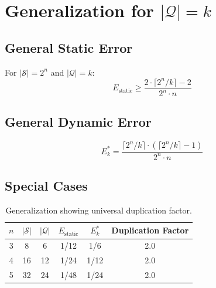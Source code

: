 \documentclass[11pt]{article}
\begin{document}
\appendix

\section{Generalization for $|\mathcal{Q}| = k$}

\subsection{General Static Error}

For $|\mathcal{S}| = 2^n$ and $|\mathcal{Q}| = k$:
$$E_{\text{static}} \geq \frac{2 \cdot \lceil 2^n / k \rceil - 2}{2^n \cdot n}$$

\subsection{General Dynamic Error}

$$E_k^* = \frac{\lceil 2^n / k \rceil \cdot (\lceil 2^n / k \rceil - 1)}{2^n \cdot n}$$

\subsection{Special Cases}

\begin{table}[h]
\centering
\caption{Generalization showing universal duplication factor.}
\label{tab:generalization}
\begin{tabular}{@{}cccccc@{}}
\toprule
$n$ & $|\mathcal{S}|$ & $|\mathcal{Q}|$ & $E_{\text{static}}$ & $E_k^*$ & Duplication Factor \\
\midrule
3 & 8 & 6 & 1/12 & 1/6 & 2.0 \\
4 & 16 & 12 & 1/24 & 1/12 & 2.0 \\
5 & 32 & 24 & 1/48 & 1/24 & 2.0 \\
\bottomrule
\end{tabular}
\end{table}
\end{document}
